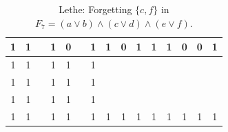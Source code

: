\begin{table}[!tb]
\begin{tabular}{|c|c|c|c|c|c|c|c|c|c|c|c|c|c|c|}
        \rowcolor{yellow!40} 1 & 1 &  & 1 & 0 &  & 1 & 1 & 0 & 1 & 1 & 1 & 0 & 0 & 1 \\ \hline
        \rowcolor{gray!40} 1 & 1 &  & 1 & 1 &  & 1 &  &  &  &  &  &  &  &  \\ \hline
        \rowcolor{gray!40} 1 & 1 &  & 1 & 1 &  & 1 &  &  &  &  &  &  &  &  \\ \hline
        \rowcolor{gray!40} 1 & 1 &  & 1 & 1 &  & 1 &  &  &  &  &  &  &  &  \\ \hline
        \rowcolor{gray!40} 1 & 1 &  & 1 & 1 &  & 1 & 1 & 1 & 1 & 1 & 1 & 1 & 1 & 1 \\ \hline
    \end{tabular}
    \caption{Lethe: Forgetting $\{c, f\}$ in $F_{7} = (a \lor b) \land (c \lor d) \land (e \lor f)$.}
    \label{tab:lethe-F7-cf}
\end{table}

